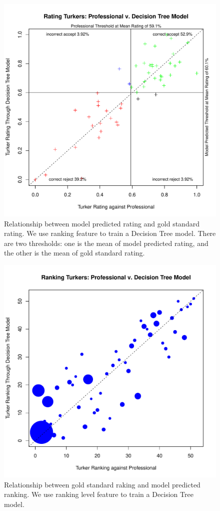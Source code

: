 \documentclass[11pt]{article}
\begin{document}
\begin{figure}[htbp]
  \centering
  \includegraphics[width=\linewidth]{Rankingfeature/rrankingrankingfeaturedt2.pdf}
  \caption{Relationship between model predicted rating and gold standard rating. We use ranking  feature to train a Decision Tree model. There are two thresholds: one is the mean of model predicted rating, and the other is the mean of gold standard rating.}
    \label{fdtrankingrrating2}
\end{figure}

\begin{figure}[htbp]
  \centering
  \includegraphics[width=\linewidth]{Rankingfeature/rankfeatureorderdt.pdf}
  \caption{Relationship between gold standard raking and model predicted ranking. We use ranking level feature to train a Decision Tree model. }
    \label{fdtrankingrorder}
\end{figure}
\end{document}
